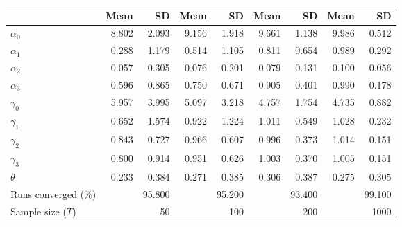 
\begin{tabular}[t]{lrrrrrrrr}
\toprule
  & Mean & SD & Mean  & SD  & Mean   & SD   & Mean    & SD   \\
\midrule
$\alpha_{0}$ & 8.802 & 2.093 & 9.156 & 1.918 & 9.661 & 1.138 & 9.986 & 0.512\\
$\alpha_{1}$ & 0.288 & 1.179 & 0.514 & 1.105 & 0.811 & 0.654 & 0.989 & 0.292\\
$\alpha_{2}$ & 0.057 & 0.305 & 0.076 & 0.201 & 0.079 & 0.131 & 0.100 & 0.056\\
$\alpha_{3}$ & 0.596 & 0.865 & 0.750 & 0.671 & 0.905 & 0.401 & 0.990 & 0.178\\
$\gamma_{0}$ & 5.957 & 3.995 & 5.097 & 3.218 & 4.757 & 1.754 & 4.735 & 0.882\\
$\gamma_{1}$ & 0.652 & 1.574 & 0.922 & 1.224 & 1.011 & 0.549 & 1.028 & 0.232\\
$\gamma_{2}$ & 0.843 & 0.727 & 0.966 & 0.607 & 0.996 & 0.373 & 1.014 & 0.151\\
$\gamma_{3}$ & 0.800 & 0.914 & 0.951 & 0.626 & 1.003 & 0.370 & 1.005 & 0.151\\
$\theta$ & 0.233 & 0.384 & 0.271 & 0.385 & 0.306 & 0.387 & 0.275 & 0.305\\
Runs converged (\%) &  & 95.800 &  & 95.200 &  & 93.400 &  & 99.100\\
Sample size ($T$) &  & 50 &  & 100 &  & 200 &  & 1000\\
\bottomrule
\end{tabular}
